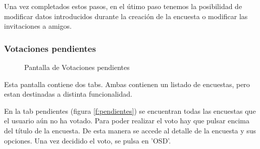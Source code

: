 \documentclass[a4paper, 12pt]{book}
\begin{document}
Una vez completados estos pasos, en el \'utimo paso tenemos la posibilidad de modificar datos introducidos 
durante la creaci\'on de la encuesta o modificar las invitaciones a amigos. 


\subsubsection{Votaciones pendientes}
\label{sec:votacion_pendiente}

\begin{figure}[H]
 \centering
 \caption{Pantalla de Votaciones pendientes}
 \label{f:votaciones_pendientes}
\end{figure}

Esta pantalla contiene dos tabs. Ambas contienen un listado de encuestas, pero estan destinadas a distinta funcionalidad.

En la tab pendientes (figura \ref{f:pendientes}) se encuentran todas las encuestas que el usuario a\'un no ha votado. Para poder
realizar el voto hay que pulsar encima del t\'itulo de la encuesta. De esta manera se accede al detalle de la encuesta y sus opciones.
Una vez decidido el voto, se pulsa en 'OSD'.
\end{document}
